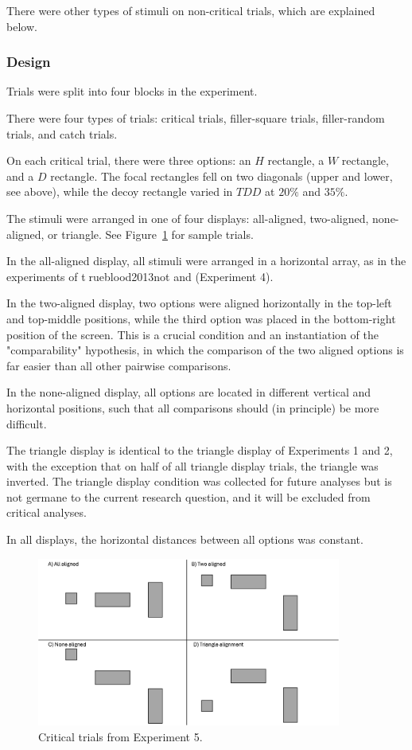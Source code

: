 There were other types of stimuli on non-critical trials, which are explained below.

\subsubsection{Design}
Trials were split into four blocks in the experiment.

There were four types of trials: critical trials, filler-square trials, filler-random trials, and catch trials.

On each critical trial, there were three options: an $H$ rectangle, a $W$ rectangle, and a $D$ rectangle. The focal rectangles fell on two diagonals (upper and lower, see above), while the decoy rectangle varied in $TDD$ at $20\%$ and $35\%$. 

The stimuli were arranged in one of four displays: all-aligned, two-aligned, none-aligned, or triangle. See Figure~\ref{fig:comparability_trials} for sample trials. 

In the all-aligned display, all stimuli were arranged in a horizontal array, as in the experiments of \textcircled{trueblood2013not} and \textcite{spektorWhenGoodLooks2018b} (Experiment 4). 

In the two-aligned display, two options were aligned horizontally in the top-left and top-middle positions, while the third option was placed in the bottom-right position of the screen. This is a crucial condition and an instantiation of the "comparability" hypothesis, in which the comparison of the two aligned options is far easier than all other pairwise comparisons.

In the none-aligned display, all options are located in different vertical and horizontal positions, such that all comparisons should (in principle) be more difficult.

The triangle display is identical to the triangle display of Experiments 1 and 2, with the exception that on half of all triangle display trials, the triangle was inverted. The triangle display condition was collected for future analyses but is not germane to the current research question, and it will be excluded from critical analyses.

In all displays, the horizontal distances between all options was constant.

\begin{figure}
   \includegraphics[width=100mm]{figures/comparability_design.jpg}
   \caption{Critical trials from Experiment 5.}
   \label{fig:comparability_trials}
\end{figure}

